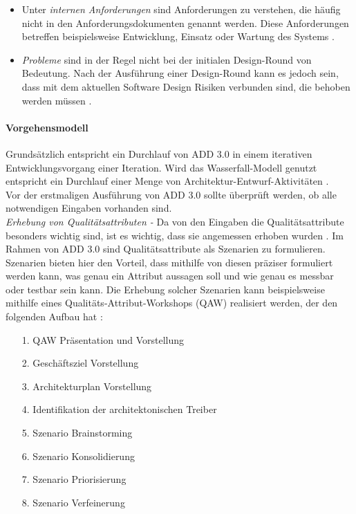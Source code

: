 \begin{itemize}
\begin{itemize}
\item Unter \emph{internen Anforderungen} sind Anforderungen zu verstehen, die h\"aufig nicht in den Anforderungsdokumenten genannt werden. Diese Anforderungen betreffen beispielsweise Entwicklung, Einsatz oder Wartung des Systems \cite{Cer01}.  
\item \emph{Probleme} sind in der Regel nicht bei der initialen Design-Round von Bedeutung. Nach der Ausf\"uhrung einer Design-Round kann es jedoch sein, dass mit dem aktuellen Software Design Risiken verbunden sind, die behoben werden m\"ussen \cite{Cer01}.\\
\end{itemize}
\end{itemize}

\paragraph{Vorgehensmodell}
Grunds\"atzlich entspricht ein Durchlauf von ADD 3.0 in einem iterativen Entwicklungsvorgang einer Iteration. Wird das Wasserfall-Modell genutzt entspricht ein Durchlauf einer Menge von Architektur-Entwurf-Aktivit\"aten \cite{Cer01}.\\

Vor der erstmaligen Ausf\"uhrung von ADD 3.0 sollte \"uberpr\"uft werden, ob alle notwendigen Eingaben vorhanden sind.\\

\emph{Erhebung von Qualit\"atsattributen -}
Da von den Eingaben die Qualit\"atsattribute besonders wichtig sind, ist es wichtig, dass sie angemessen erhoben wurden \cite{Cer01}. Im Rahmen von ADD 3.0 sind Qualit\"atsattribute als Szenarien zu formulieren. Szenarien bieten hier den Vorteil, dass mithilfe von diesen pr\"aziser formuliert werden kann, was genau ein Attribut aussagen soll und wie genau es messbar oder testbar sein kann. Die Erhebung solcher Szenarien kann beispielsweise mithilfe eines Qualit\"ats-Attribut-Workshops (QAW) realisiert werden, der den folgenden Aufbau hat \cite{Cer01}:\\

\begin{itemize}
\item[1.] QAW Pr\"asentation und Vorstellung
\item[2.] Gesch\"aftsziel Vorstellung
\item[3.] Architekturplan Vorstellung
\item[4.] Identifikation der architektonischen Treiber
\item[5.] Szenario Brainstorming
\item[6.] Szenario Konsolidierung
\item[7.] Szenario Priorisierung
\item[8.] Szenario Verfeinerung \\
\end{itemize}

